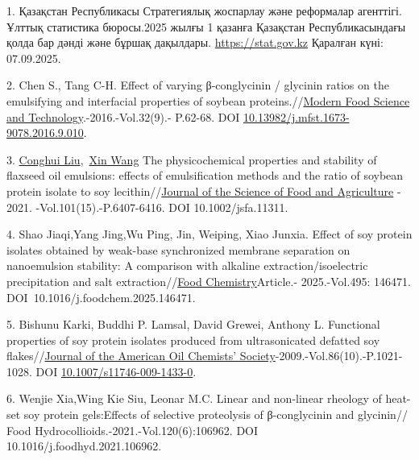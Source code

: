 \begin{refs}
1. Қазақстан Республикасы Стратегиялық жоспарлау және реформалар
агенттігі. Ұлттық статистика бюросы.2025 жылғы 1 қазанға Қазақстан
Республикасындағы қолда бар дәнді және бұршақ дақылдары.
\href{https://stat.gov.kz/search/index.php?q=\%D0\%B4\%D3\%99\%D0\%BD\%D0\%B4\%D1\%96+&s}{https://stat.gov.kz} Қаралған күні: 07.09.2025.

2. Chen S., Tang C-H. Effect of varying β-conglycinin / glycinin ratios
on the emulsifying and interfacial properties of soybean
proteins.//\href{https://www.researchgate.net/journal/Modern-Food-Science-and-Technology-1673-9078?_tp=eyJjb250ZXh0Ijp7ImZpcnN0UGFnZSI6InB1YmxpY2F0aW9uIiwicGFnZSI6InB1YmxpY2F0aW9uIn19}{Modern
Food Science and Technology}.-2016.-Vol.32(9).- P.62-68. DOI
\href{https://doi.org/10.13982/j.mfst.1673-9078.2016.9.010}{10.13982/j.mfst.1673-9078.2016.9.010}.

3. \href{https://scijournals.onlinelibrary.wiley.com/authored-by/Liu/Conghui}{Conghui
Liu},~\href{https://scijournals.onlinelibrary.wiley.com/authored-by/Wang/Xin}{Xin
Wang} The physicochemical properties and stability of flaxseed oil
emulsions: effects of emulsification methods and the ratio of soybean
protein isolate to soy
lecithin//\href{https://www.scopus.com/pages/publications/85106255803?origin=document-preview-flyout}{Journal
of the Science of Food and Agriculture} -
2021. -Vol.101(15).-P.6407-6416. DOI 10.1002/jsfa.11311.

4. Shao Jiaqi,Yang Jing,Wu Ping, Jin, Weiping, Xiao Junxia. Effect of
soy protein isolates obtained by weak-base synchronized membrane
separation on nanoemulsion stability: A comparison with alkaline
extraction/isoelectric precipitation and salt
extraction//\href{https://www.scopus.com/pages/publications/105016785177?origin=document-preview-flyout}{Food
Chemistry}Article.- 2025.-Vol.495: 146471.
DOI~10.1016/j.foodchem.2025.146471.

5. Bishunu Karki, Buddhi P. Lamsal, David Grewei, Anthony L. Functional
properties of soy protein isolates produced from ultrasonicated defatted
soy flakes//\href{https://www.researchgate.net/journal/Journal-of-the-American-Oil-Chemists-Society-1558-9331?_tp=eyJjb250ZXh0Ijp7ImZpcnN0UGFnZSI6InB1YmxpY2F0aW9uIiwicGFnZSI6InB1YmxpY2F0aW9uIn19}{Journal
of the American Oil Chemists'{}
Society}-2009.-Vol.86(10).-P.1021-1028. DOI
\href{https://doi.org/10.1007/s11746-009-1433-0?urlappend=?utm_source=researchgate.net&utm_medium=article}{10.1007/s11746-009-1433-0}.

6. Wenjie Xia,Wing Kie Siu, Leonar M.C. Linear and non-linear rheology
of heat-set soy protein gels:Effects of selective proteolysis of
β-conglycinin and glycinin// Food
Hydrocollioids.-2021.-Vol.120(6):106962. DOI
10.1016/j.foodhyd.2021.106962.


\end{refs}
